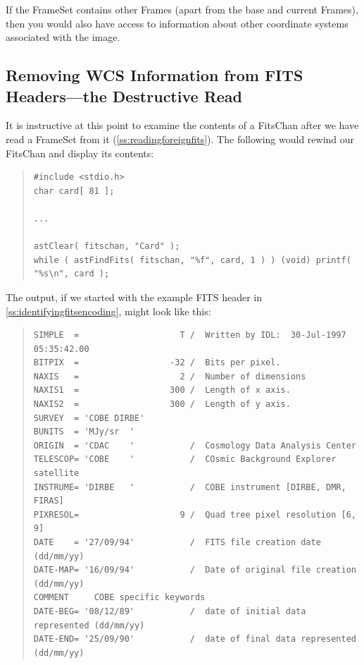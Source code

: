 \documentclass[twoside,11pt]{article}
\newcommand{\htmlref}[2]{#1}
\newcommand{\secref}[1]{\S\ref{#1}}
\renewcommand{\secref}[1]{\ref{#1}}
\begin{document}
If the FrameSet contains other Frames (apart from the base and current
Frames), then you would also have access to information about other
coordinate systems associated with the image.

\subsection{\label{ss:destructiveread}Removing WCS Information from FITS Headers---the Destructive Read}

It is instructive at this point to examine the contents of a \htmlref{FitsChan}{FitsChan}
after we have read a \htmlref{FrameSet}{FrameSet} from it
(\secref{ss:readingforeignfits}). The following would rewind our
FitsChan and display its contents:

\begin{quote}
\small
\begin{verbatim}
#include <stdio.h>
char card[ 81 ];

...

astClear( fitschan, "Card" );
while ( astFindFits( fitschan, "%f", card, 1 ) ) (void) printf( "%s\n", card );
\end{verbatim}
\normalsize
\end{quote}

The output, if we started with the example FITS header in
\secref{ss:identifyingfitsencoding}, might look like this:

\begin{quote}
\small
\begin{verbatim}
SIMPLE  =                    T /  Written by IDL:  30-Jul-1997 05:35:42.00      
BITPIX  =                  -32 /  Bits per pixel.                               
NAXIS   =                    2 /  Number of dimensions                          
NAXIS1  =                  300 /  Length of x axis.                             
NAXIS2  =                  300 /  Length of y axis.                             
SURVEY  = 'COBE DIRBE'                                                          
BUNITS  = 'MJy/sr  '                                                            
ORIGIN  = 'CDAC    '           /  Cosmology Data Analysis Center                
TELESCOP= 'COBE    '           /  COsmic Background Explorer satellite          
INSTRUME= 'DIRBE   '           /  COBE instrument [DIRBE, DMR, FIRAS]           
PIXRESOL=                    9 /  Quad tree pixel resolution [6, 9]             
DATE    = '27/09/94'           /  FITS file creation date (dd/mm/yy)            
DATE-MAP= '16/09/94'           /  Date of original file creation (dd/mm/yy)     
COMMENT     COBE specific keywords                                              
DATE-BEG= '08/12/89'           /  date of initial data represented (dd/mm/yy)   
DATE-END= '25/09/90'           /  date of final data represented   (dd/mm/yy)   
\end{verbatim}
\normalsize
\end{quote}
\end{document}
